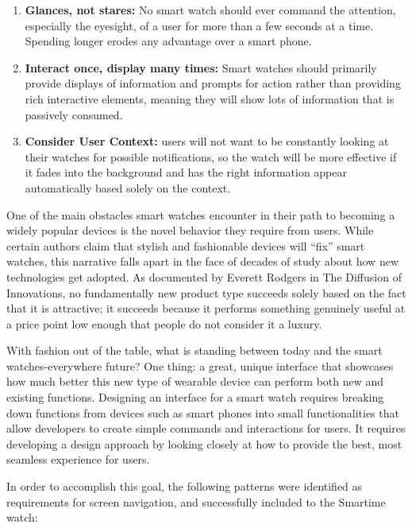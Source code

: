 \documentclass{article}
\begin{document}
\begin{enumerate}
\item \textbf{Glances, not stares:} No smart watch should ever command the attention, especially the eyesight, of a user for more than a few seconds at a time. Spending longer erodes any advantage over a smart phone.
\item \textbf{Interact once, display many times:} Smart watches should primarily provide displays of information and prompts for action rather than providing rich interactive elements, meaning they will show lots of information that is passively consumed.
\item  \textbf{Consider User Context:}  users will not want to be constantly looking at their watches for possible notifications, so the watch will be more effective if it fades into the background and has the right information appear automatically based solely on the context. 
\end{enumerate}

One of the main obstacles smart watches encounter in their path to becoming a widely popular devices is the novel behavior they require from users. While certain authors claim that stylish and fashionable devices will ``fix'' smart watches, this narrative falls apart in the face of decades of study about how new technologies get adopted. As documented by Everett Rodgers in The Diffusion of Innovations, no fundamentally new product type succeeds solely based on the fact that it is attractive; it succeeds because it performs something genuinely useful at a price point low enough that people do not consider it a luxury. 

With fashion out of the table, what is standing between today and the smart watches-everywhere future? One thing: a great, unique interface that showcases how much better this new type of wearable device can perform both new and existing functions. Designing an interface for a smart watch requires breaking down functions from devices such as smart phones into small functionalities that allow developers to create simple commands and interactions for users. It requires developing a design approach by looking closely at how to provide the best, most seamless experience for users.

In order to accomplish this goal, the following patterns were identified as requirements for screen navigation, and successfully included to the Smartime watch:
\end{document}
